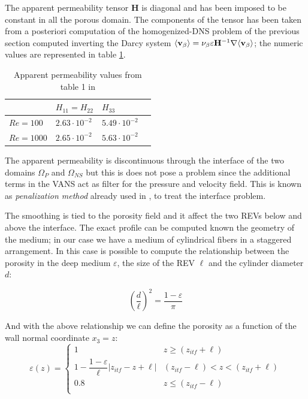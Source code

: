 The apparent permeability tensor $\mathbf{H}$ is diagonal and has been imposed to be constant in all the porous domain.
The components of the tensor has been taken from a posteriori computation of the homogenized-DNS problem of the previous section computed inverting the Darcy system ${\left< \textbf{v}_{\beta} \right>} = \nu_{\beta} \varepsilon \mathbf{H}^{-1} \nabla {\left< \textbf{v}_{\beta} \right>}$; the numeric values are represented in table \ref{tab:H}.

\begin{table}[h]
	\centering
	\begin{tabular}{ l | l |  l   l   }
		& $H_{11} = H_{22}$ & $H_{33}$ \\ 
		\hline
		\hline
		$Re=100$ & $2.63 \cdot 10^{-2}$ & $5.49 \cdot 10^{-2}$ \\ 
		$Re=1000$ & $2.65 \cdot 10^{-2}$ & $5.63 \cdot 10^{-2}$
	\end{tabular}
	\caption{Apparent permeability values from table 1 in \citet{zampogna2016fluid}}
	\label{tab:H}
\end{table}


The apparent permeability is discontinuous through the interface of the two domains $\Omega_P$ and $\Omega_{NS}$ but this is does not pose a problem since the additional terms in the VANS act as filter for the pressure and velocity field.
This is known as \textit{penalization method} already used in \citet{cimolin2013navier}, \citet{bruneau2008numerical} to treat the interface problem.

The smoothing is tied to the porosity field and it affect the two REVs below and above the interface.
The exact profile can be computed known the geometry of the medium; in our case we have a medium of cylindrical fibers in a staggered arrangement.
In this case is possible to compute the relationship between the porosity in the deep medium $\varepsilon$, the size of the REV $\ell$ and the cylinder diameter $d$:

$$
\left( \dfrac{d}{\ell} \right)^2 = \dfrac{1 - \varepsilon}{\pi}
$$

And with the above relationship we can define the porosity as a function of the wall normal coordinate $x_3 = z$:
\begin{equation}
\varepsilon(z) = 
\begin{cases}
1 & z\geqslant(z_{itf}+\ell) \\
1 - \dfrac{1-\varepsilon}{\ell}|z_{itf} -z +\ell| &  (z_{itf}-\ell)<z<(z_{itf}+\ell)\\
0.8 &z\leqslant(z_{itf}-\ell) \\
\end{cases}
\label{eq:porsitity_fun}
\end{equation}

